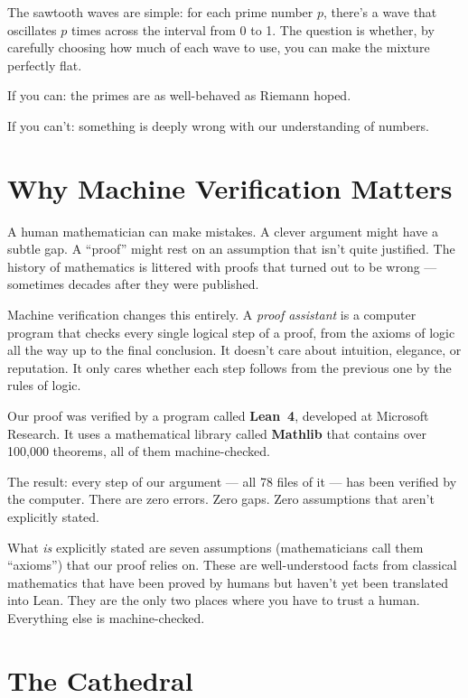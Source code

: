 \documentclass[12pt,a4paper]{article}
\begin{document}
The sawtooth waves are simple: for each prime number $p$, there's a wave
that oscillates $p$ times across the interval from 0 to 1. The question
is whether, by carefully choosing how much of each wave to use, you can
make the mixture perfectly flat.

If you can: the primes are as well-behaved as Riemann hoped.

If you can't: something is deeply wrong with our understanding of numbers.

\section*{Why Machine Verification Matters}

A human mathematician can make mistakes. A clever argument might have a
subtle gap. A ``proof'' might rest on an assumption that isn't quite
justified. The history of mathematics is littered with proofs that
turned out to be wrong --- sometimes decades after they were published.

Machine verification changes this entirely. A \emph{proof assistant} is
a computer program that checks every single logical step of a proof, from
the axioms of logic all the way up to the final conclusion. It doesn't
care about intuition, elegance, or reputation. It only cares whether each
step follows from the previous one by the rules of logic.

Our proof was verified by a program called \textbf{Lean~4}, developed at
Microsoft Research. It uses a mathematical library called \textbf{Mathlib}
that contains over 100,000 theorems, all of them machine-checked.

The result: every step of our argument --- all 78 files of it --- has been
verified by the computer. There are zero errors. Zero gaps. Zero
assumptions that aren't explicitly stated.

What \emph{is} explicitly stated are seven assumptions (mathematicians call
them ``axioms'') that our proof relies on. These are well-understood facts
from classical mathematics that have been proved by humans but haven't
yet been translated into Lean. They are the only two places where you
have to trust a human. Everything else is machine-checked.

\section*{The Cathedral}
\end{document}
